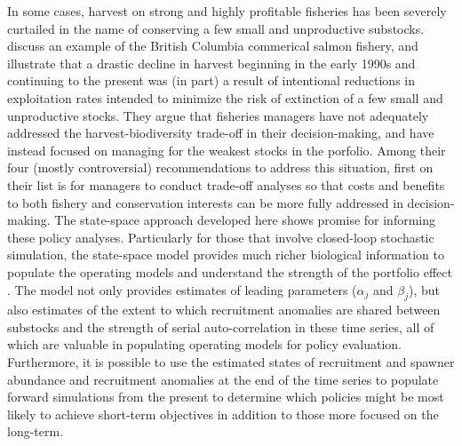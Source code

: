 \documentclass[12pt,]{book}
\theoremstyle{definition}
\theoremstyle{definition}
\theoremstyle{definition}
\theoremstyle{remark}
\begin{document}
In some cases, harvest on strong and highly profitable fisheries has
been severely curtailed in the name of conserving a few small and
unproductive substocks. \citet{walters-etal-2018} discuss an example of
the British Columbia commerical salmon fishery, and illustrate that a
drastic decline in harvest beginning in the early 1990s and continuing
to the present was (in part) a result of intentional reductions in
exploitation rates intended to minimize the risk of extinction of a few
small and unproductive stocks. They argue that fisheries managers have
not adequately addressed the harvest-biodiversity trade-off in their
decision-making, and have instead focused on managing for the weakest
stocks in the porfolio. Among their four (mostly controversial)
recommendations to address this situation, first on their list is for
managers to conduct trade-off analyses so that costs and benefits to
both fishery and conservation interests can be more fully addressed in
decision-making. The state-space approach developed here shows promise
for informing these policy analyses. Particularly for those that involve
closed-loop stochastic simulation, the state-space model provides much
richer biological information to populate the operating models and
understand the strength of the portfolio effect \citep[which is
inversely related to the magnitude of shared recruitment
trends;][]{schindler-etal-2010, schindler-etal-2015}. The model not only
provides estimates of leading parameters (\(\alpha_j\) and \(\beta_j\)),
but also estimates of the extent to which recruitment anomalies are
shared between substocks and the strength of serial auto-correlation in
these time series, all of which are valuable in populating operating
models for policy evaluation. Furthermore, it is possible to use the
estimated states of recruitment and spawner abundance and recruitment
anomalies at the end of the time series to populate forward simulations
from the present to determine which policies might be most likely to
achieve short-term objectives in addition to those more focused on the
long-term.

\singlespacing
\end{document}
